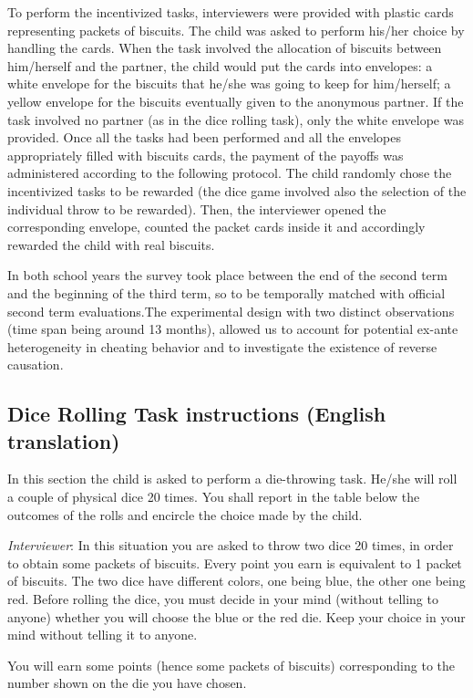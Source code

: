 \documentclass[authoryear, preprint, review, 12pt]{elsarticle}
\begin{document}
To perform the incentivized tasks, interviewers were provided with plastic cards representing packets of biscuits. The child was asked to perform his/her choice by handling the cards. When the task involved the allocation of biscuits between him/herself and the partner, the child would put the cards into envelopes: a white envelope for the biscuits that he/she was going to keep for him/herself; a yellow envelope for the biscuits eventually given to the anonymous partner. If the task involved no partner (as in the dice rolling task), only the white envelope was provided. 
Once all the tasks had been performed and all the envelopes appropriately filled with biscuits cards, the payment of the payoffs was administered according to the following protocol. The child randomly chose the incentivized tasks to be rewarded (the dice game involved also the selection of the individual throw to be rewarded). Then, the interviewer opened the corresponding envelope, counted the packet cards inside it and accordingly rewarded the child with real biscuits.

In both school years the survey took place between the end of the second term and the beginning of the third term, so to be temporally matched with official second term evaluations.The experimental design with two distinct observations (time span being around 13 months), allowed us to account for potential ex-ante heterogeneity in cheating behavior and to investigate the existence of reverse causation.

\subsection{Dice Rolling Task instructions (English translation)}
In this section the child is asked to perform a die-throwing task. He/she will roll a couple of physical dice 20 times. You shall report in the table below the outcomes of the rolls and encircle the choice made by the child.

\textit{Interviewer}: 
In this situation you are asked to throw two dice 20 times, in order to obtain some packets of biscuits. Every point you earn is equivalent to 1 packet of biscuits. The two dice have different colors, one being blue, the other one being red. Before rolling the dice, you must decide in your mind (without telling to anyone) whether you will choose the blue or the red die. Keep your choice in your mind without telling it to anyone.

You will earn some points (hence some packets of biscuits) corresponding to the number shown on the die you have chosen.
\end{document}
